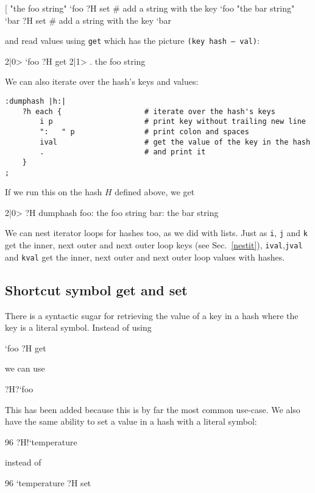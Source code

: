 \begin{v}
[%
"the foo string" `foo ?H set    # add a string with the key `foo
"the bar string" `bar ?H set    # add a string with the key `bar
\end{v}
and read values using \texttt{get} which has the picture \texttt{(key hash -- val)}:
\begin{v}
2|0> `foo ?H get
2|1> .
the foo string
\end{v}
We can also iterate over the hash's keys and values:
\begin{lstlisting}
:dumphash |h:|
    ?h each {                   # iterate over the hash's keys
        i p                     # print key without trailing new line
        ":   " p                # print colon and spaces
        ival                    # get the value of the key in the hash
        .                       # and print it
    }
;
\end{lstlisting}
If we run this on the hash $H$ defined above, we get
\begin{v}
2|0> ?H dumphash
foo:   the foo string
bar:   the bar string
\end{v}
We can nest iterator loops for hashes too, as we did with lists.
Just as \texttt{i}, \texttt{j} and \texttt{k} get the inner, next outer
and next outer loop keys (see Sec.~\ref{nestit}), \texttt{ival},\texttt{jval} and \texttt{kval} get
the inner, next outer and next outer loop values with hashes.


\subsection{Shortcut symbol get and set}
There is a syntactic sugar for retrieving the value of a key in
a hash where the key is a literal symbol. Instead of using
\begin{v}
`foo ?H get
\end{v}
we can use
\begin{v}
?H?`foo
\end{v}
This has been added because this is by far the most common use-case.
We also have the same ability to set a value in a hash with a literal
symbol:
\begin{v}
96 ?H!`temperature
\end{v}
instead of
\begin{v}
96 `temperature ?H set
\end{v}

